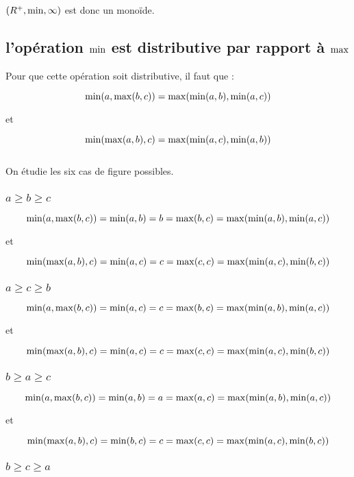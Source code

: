 \documentclass{article}
\begin{document}
$(R^+, \mmin, \infty)$ est donc un monoïde.

\subsection{l'opération $\mmin$ est distributive par rapport à $\mmax$}

Pour que cette opération soit distributive, il faut que :

$$\mmin(a, \mmax(b,c)) = \mmax(\mmin(a,b),\mmin(a,c))$$
\begin{center}et\end{center}
$$\mmin(\mmax(a,b),c) = \mmax(\mmin(a,c),\mmin(a,b))$$\\

On étudie les six cas de figure possibles.

\subsubsection{$a \geq b \geq c$}

$$\mmin(a, \mmax(b, c)) = \mmin(a, b) = b = \mmax(b,c) = \mmax(\mmin(a, b),\mmin(a,c))$$
\begin{center}et\end{center}
$$\mmin(\mmax(a,b),c) = \mmin(a,c) = c = \mmax(c,c) = \mmax(\mmin(a,c),\mmin(b,c))$$

\subsubsection{$a \geq c \geq b$}

$$\mmin(a, \mmax(b, c)) = \mmin(a, c) = c = \mmax(b,c) = \mmax(\mmin(a, b),\mmin(a,c))$$
\begin{center}et\end{center}
$$\mmin(\mmax(a,b),c) = \mmin(a,c) = c = \mmax(c,c) = \mmax(\mmin(a,c),\mmin(b,c))$$

\subsubsection{$b \geq a \geq c$}

$$\mmin(a, \mmax(b, c)) = \mmin(a, b) = a = \mmax(a,c) = \mmax(\mmin(a, b),\mmin(a,c))$$
\begin{center}et\end{center}
$$\mmin(\mmax(a,b),c) = \mmin(b,c) = c = \mmax(c,c) = \mmax(\mmin(a,c),\mmin(b,c))$$

\subsubsection{$b \geq c \geq a$}
\end{document}

